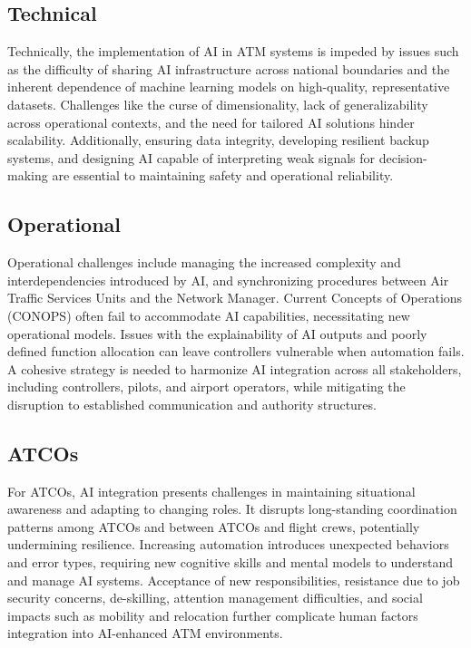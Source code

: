\subsection{Technical}

Technically, the implementation of \gls{AI} in \gls{ATM} systems is impeded by issues such as the difficulty of sharing \gls{AI} infrastructure across national boundaries and the inherent dependence of machine learning models on high-quality, representative datasets. 
Challenges like the curse of dimensionality, lack of generalizability across operational contexts, and the need for tailored \gls{AI} solutions hinder scalability. 
Additionally, ensuring data integrity, developing resilient backup systems, and designing \gls{AI} capable of interpreting weak signals for decision-making are essential to maintaining safety and operational reliability.

\subsection{Operational}

Operational challenges include managing the increased complexity and interdependencies introduced by \gls{AI}, and synchronizing procedures between Air Traffic Services Units and the Network Manager. 
Current Concepts of Operations (CONOPS) often fail to accommodate \gls{AI} capabilities, necessitating new operational models. 
Issues with the explainability of AI outputs and poorly defined function allocation can leave controllers vulnerable when automation fails. 
A cohesive strategy is needed to harmonize AI integration across all stakeholders, including controllers, pilots, and airport operators, while mitigating the disruption to established communication and authority structures.

\subsection{ATCOs}

For \glspl{ATCO}, \gls{AI} integration presents challenges in maintaining situational awareness and adapting to changing roles. 
It disrupts long-standing coordination patterns among \glspl{ATCO} and between \glspl{ATCO} and flight crews, potentially undermining resilience. 
Increasing automation introduces unexpected behaviors and error types, requiring new cognitive skills and mental models to understand and manage \gls{AI} systems. 
Acceptance of new responsibilities, resistance due to job security concerns, de-skilling, attention management difficulties, and social impacts such as mobility and relocation further complicate human factors integration into \gls{AI}-enhanced \gls{ATM} environments.